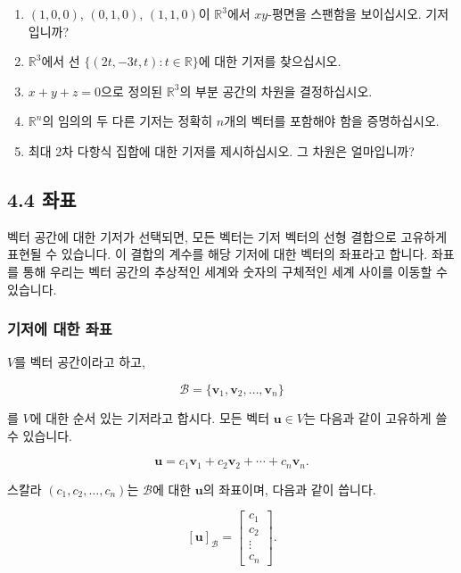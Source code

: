 \documentclass[
  12pt,
  a4paper,
]{article}
\begin{document}
\begin{enumerate}
\def\labelenumi{\arabic{enumi}.}
\item
  \((1,0,0)\), \((0,1,0)\), \((1,1,0)\)이 \(\mathbb{R}^3\)에서 \(xy\)-평면을 스팬함을 보이십시오. 기저입니까?
\item
  \(\mathbb{R}^3\)에서 선 \(\{(2t,-3t,t) : t \in \mathbb{R}\}\)에 대한 기저를 찾으십시오.
\item
  \(x+y+z=0\)으로 정의된 \(\mathbb{R}^3\)의 부분 공간의 차원을 결정하십시오.
\item
  \(\mathbb{R}^n\)의 임의의 두 다른 기저는 정확히 \(n\)개의 벡터를 포함해야 함을 증명하십시오.
\item
  최대 2차 다항식 집합에 대한 기저를 제시하십시오. 그 차원은 얼마입니까?
\end{enumerate}

\subsection{4.4 좌표}\label{44-coordinates}

벡터 공간에 대한 기저가 선택되면, 모든 벡터는 기저 벡터의 선형 결합으로 고유하게 표현될 수 있습니다. 이 결합의 계수를 해당 기저에 대한 벡터의 좌표라고 합니다. 좌표를 통해 우리는 벡터 공간의 추상적인 세계와 숫자의 구체적인 세계 사이를 이동할 수 있습니다.

\subsubsection{기저에 대한 좌표}\label{coordinates-relative-to-a-basis}

\(V\)를 벡터 공간이라고 하고,

\[\mathcal{B} = \{\mathbf{v}_1, \mathbf{v}_2, \dots, \mathbf{v}_n\}\]

를 \(V\)에 대한 순서 있는 기저라고 합시다. 모든 벡터 \(\mathbf{u} \in V\)는 다음과 같이 고유하게 쓸 수 있습니다.

\[\mathbf{u} = c_1 \mathbf{v}_1 + c_2 \mathbf{v}_2 + \cdots + c_n \mathbf{v}_n.\]

스칼라 \((c_1, c_2, \dots, c_n)\)는 \(\mathcal{B}\)에 대한 \(\mathbf{u}\)의 좌표이며, 다음과 같이 씁니다.

\[[\mathbf{u}]_{\mathcal{B}} = \begin{bmatrix} c_1 \\ c_2 \\ \vdots \\ c_n \end{bmatrix}.\]
\end{document}
